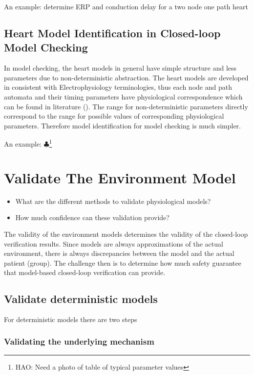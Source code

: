 \documentclass[openany]{now} %
\newcommand{\Hao}[1]{$\clubsuit$\footnote{HAO: #1}}
\begin{document}
An example: determine ERP and conduction delay for a two node one path heart
\section{Heart Model Identification in Closed-loop Model Checking}
In model checking, the heart models in general have simple structure and less parameters due to non-deterministic abstraction. The heart models are developed in consistent with Electrophysiology terminologies, thus each node and path automata and their timing parameters have physiological correspondence which can be found in literature (\cite{josephson}). The range for non-deterministic parameters directly correspond to the range for possible values of corresponding physiological parameters. Therefore model identification for model checking is much simpler. 

An example: \Hao{Need a photo of table of typical parameter values}







\chapter{Validate The Environment Model}
\begin{itemize}
	\item What are the different methods to validate physiological models?
    \item How much confidence can these validation provide?
\end{itemize}
The validity of the environment models determines the validity of the closed-loop verification results. Since models are always approximations of the actual environment, there is always discrepancies between the model and the actual patient (group). The challenge then is to determine how much safety guarantee that model-based closed-loop verification can provide. 

\section{Validate deterministic models}
For deterministic models there are two steps

\subsection{Validating the underlying mechanism}
\end{document}
